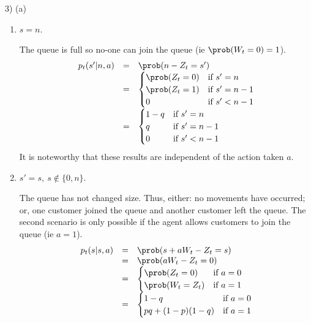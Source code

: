 \documentclass[11pt,a4paper]{article}
\begin{document}
\begin{answer}{3) (a)}
\begin{itemize}
\begin{enumerate}
      \item $s=n$.
      \par The queue is full so no-one can join the queue (ie $\prob(W_t=0)=1$).
      \[\begin{array}{rcl}
        p_t(s'|n,a)&=&\prob(n-Z_t=s')\\
                   &=& \begin{cases}
                         \prob(Z_t=0)&\text{if }s'=n\\
                         \prob(Z_t=1)&\text{if }s'=n-1\\
                         0&\text{if }s'<n-1
                       \end{cases}\\
                   &=& \begin{cases}
                         1-q&\text{if }s'=n\\
                         q&\text{if }s'=n-1\\
                         0&\text{if }s'<n-1
                       \end{cases}\\
      \end{array}\]
      It is noteworthy that these results are independent of the action taken $a$.

      \item $s'=s,\ s\not\in\{0,n\}$.
      \par The queue has not changed size. Thus, either: no movements have occurred; or, one customer joined the queue and another customer left the queue. The second scenario is only possible if the agent allows customers to join the queue (ie $a=1$).
      \[\begin{array}{rcl}
        p_t(s|s,a)&=&\prob(s+aW_t-Z_t=s)\\
        &=&\prob(aW_t-Z_t=0)\\
        &=&\begin{cases}
             \prob(Z_t=0)&\text{if }a=0\\
             \prob(W_t=Z_t)&\text{if }a=1
           \end{cases}\\
        &=&\begin{cases}
            1-q&\text{if }a=0\\
            pq+(1-p)(1-q)&\text{if }a=1
          \end{cases}
      \end{array}\]


\end{enumerate}
\end{itemize}
\end{answer}
\end{document}
